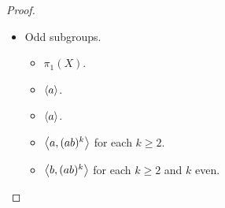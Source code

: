 \documentclass[12pt, psamsfonts]{amsart}
\theoremstyle{definition}
\theoremstyle{remark}
\numberwithin{equation}{section}
\begin{document}
\begin{proof}
\begin{itemize}
\begin{itemize}
      \end{itemize}
    \item
      Odd subgroups.
      \begin{itemize}
        \item
          $\pi_1(X)$.
        \item
          $\ev{a}$.
        \item
          $\ev{a}$.
        \item
          $\ev{a, (ab)^k}$ for each $k \geq 2$.
        \item
          $\ev{b, (ab)^k}$ for each $k \geq 2$ and $k$ even.
      \end{itemize}
  \end{itemize}
\end{proof}
\end{document}
